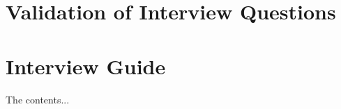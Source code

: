 \documentclass[12pt,a4paper,titlepage,oneside,abstract=true,toc=listof,toc=bibliography]{scrreprt}
\begin{document}
\cleardoublepage

\begin{appendices}
\appendixpage

\chapter{Validation of Interview Questions}

\cleardoublepage

\chapter{Interview Guide}
The contents...

\cleardoublepage

%

\end{appendices}

\cleardoublepage
\end{document}
